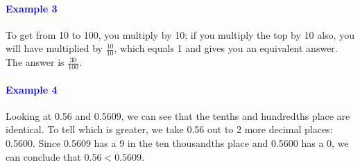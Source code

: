 \documentclass[a4paper, 12pt]{article}
\begin{document}
\paragraph{\textcolor{blue}{Example 3}} To get from 10 to 100, you multiply by 10; if you multiply the top by 10 also, you will have multiplied by $\frac{10}{10}$, which equals 1 and gives you an equivalent answer. The answer is $\boxed{\frac{30}{100}}$.

\paragraph{\textcolor{blue}{Example 4}} Looking at 0.56 and 0.5609, we can see that the tenths and hundredths place are identical. To tell which is greater, we take 0.56 out to 2 more decimal places: 0.5600. Since 0.5609 has a 9 in the ten thousandths place and 0.5600 has a 0, we can conclude that $\boxed{0.56<0.5609}$.
\end{document}
